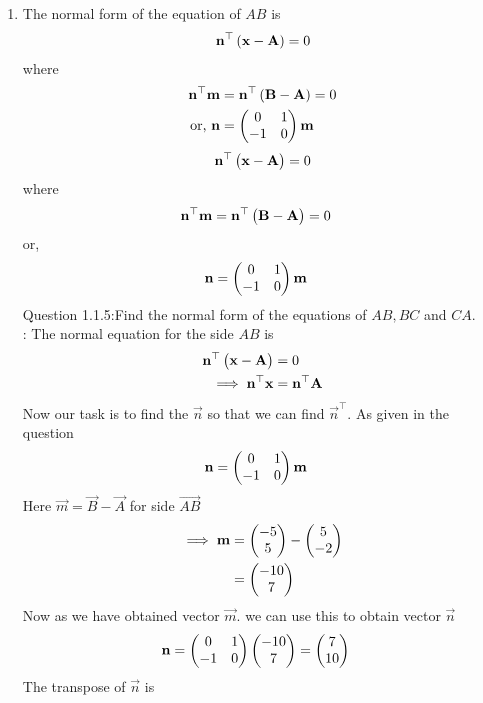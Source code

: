 \documentclass[11pt]{book}
\begin{document}
\begin{enumerate}[label=\thesection.\arabic*.,ref=\thesection.\theenumi]
\item The normal form of the equation of $AB$  is 
		\begin{align}
			\mathbf{n}^{\top}\left(	\mathbf{x}-\mathbf{A}\right) = 0
		\end{align}
		where 
		\begin{align}
			\mathbf{n}^{\top}\mathbf{m}&=\mathbf{n}^{\top}\left(\mathbf{B}-\mathbf{A}\right) = 0
			\\
			\text{or, } \mathbf{n}&=\begin{pmatrix}0 & 1 \\ -1 & 0\end{pmatrix} \mathbf{m}
		\end{align}
  \begin{align}
\mathbf{n}^{\top}\begin{pmatrix}\mathbf{x}-\mathbf{A}\end{pmatrix}=0
\end{align}
where
\begin{align}
\mathbf{n}^{\top}\mathbf{m}&=\mathbf{n}^{\top}\begin{pmatrix}\mathbf{B}-\mathbf{A}\end{pmatrix}=0
\end{align}	
or,\begin{align}
\mathbf{n}&=\begin{pmatrix}0 &1 \\-1 & 0\end{pmatrix}\mathbf{m}
\end{align}
Question 1.1.5:Find the normal form of the equations of $AB, BC$ and $CA$.\\
\solution:
       The normal equation for the side $AB$ is
\begin{align}
\mathbf{n}^{\top}\begin{pmatrix}\mathbf{x}-\mathbf{A}\end{pmatrix}&=0\\
\implies
\mathbf{n}^{\top}\mathbf{x}&=\mathbf{n}^{\top}\mathbf{A}
\end{align}
Now our task is to find the $\vec{n}$ so that we can find $\vec{n}^{\top}$.
As given in the question 
\begin{align}
  \mathbf{n} &= \begin{pmatrix}0 & 1\\
  -1 & 0\end{pmatrix}\mathbf{m}
\end{align}
Here $\vec{m} = \vec{B}- \vec{A}$ for side $\vec{AB}$
\begin{align}
\implies
\mathbf{m}&=\begin{pmatrix}-5\\5\end{pmatrix} - \begin{pmatrix}5\\-2\end{pmatrix}\\
&=\begin{pmatrix}-10\\7\end{pmatrix}
\end{align}
Now as we have obtained vector $\vec{m}$.
we can use this to obtain vector $\vec{n}$
\begin{align}
\mathbf{n} &= \begin{pmatrix}0 & 1\\
  -1 & 0\end{pmatrix}\begin{pmatrix}-10\\7\end{pmatrix}
 = \begin{pmatrix}7\\10\end{pmatrix}
\end{align}
The transpose of $\vec{n}$ is
\begin{align}

\end{align}
\end{enumerate}
\end{document}
